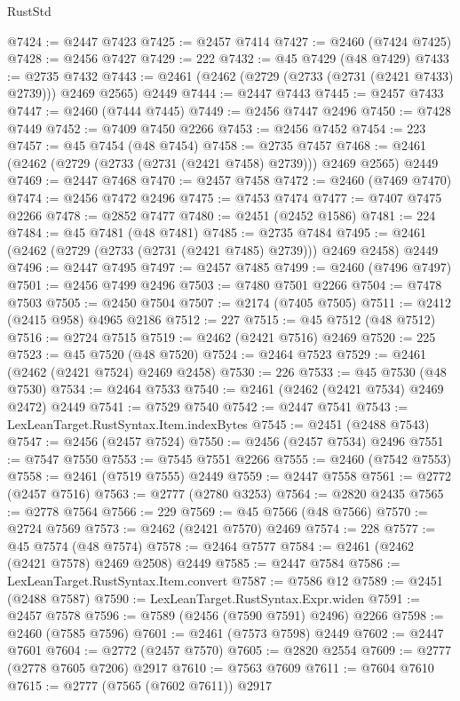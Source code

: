 \begin{lexlean}{RustStd}
\begin{coremodule}
@7424 := @2447 @7423
@7425 := @2457 @7414
@7427 := @2460 (@7424 @7425)
@7428 := @2456 @7427
@7429 := 222
@7432 := @45 @7429 (@48 @7429)
@7433 := @2735 @7432
@7443 := @2461 (@2462 (@2729 (@2733 (@2731 (@2421 @7433) @2739))) @2469 @2565) @2449
@7444 := @2447 @7443
@7445 := @2457 @7433
@7447 := @2460 (@7444 @7445)
@7449 := @2456 @7447 @2496
@7450 := @7428 @7449
@7452 := @7409 @7450 @2266
@7453 := @2456 @7452
@7454 := 223
@7457 := @45 @7454 (@48 @7454)
@7458 := @2735 @7457
@7468 := @2461 (@2462 (@2729 (@2733 (@2731 (@2421 @7458) @2739))) @2469 @2565) @2449
@7469 := @2447 @7468
@7470 := @2457 @7458
@7472 := @2460 (@7469 @7470)
@7474 := @2456 @7472 @2496
@7475 := @7453 @7474
@7477 := @7407 @7475 @2266
@7478 := @2852 @7477
@7480 := @2451 (@2452 @1586)
@7481 := 224
@7484 := @45 @7481 (@48 @7481)
@7485 := @2735 @7484
@7495 := @2461 (@2462 (@2729 (@2733 (@2731 (@2421 @7485) @2739))) @2469 @2458) @2449
@7496 := @2447 @7495
@7497 := @2457 @7485
@7499 := @2460 (@7496 @7497)
@7501 := @2456 @7499 @2496
@7503 := @7480 @7501 @2266
@7504 := @7478 @7503
@7505 := @2450 @7504
@7507 := @2174 (@7405 @7505)
@7511 := @2412 (@2415 @958) @4965 @2186
@7512 := 227
@7515 := @45 @7512 (@48 @7512)
@7516 := @2724 @7515
@7519 := @2462 (@2421 @7516) @2469
@7520 := 225
@7523 := @45 @7520 (@48 @7520)
@7524 := @2464 @7523
@7529 := @2461 (@2462 (@2421 @7524) @2469 @2458)
@7530 := 226
@7533 := @45 @7530 (@48 @7530)
@7534 := @2464 @7533
@7540 := @2461 (@2462 (@2421 @7534) @2469 @2472) @2449
@7541 := @7529 @7540
@7542 := @2447 @7541
@7543 := LexLeanTarget.RustSyntax.Item.indexBytes
@7545 := @2451 (@2488 @7543)
@7547 := @2456 (@2457 @7524)
@7550 := @2456 (@2457 @7534) @2496
@7551 := @7547 @7550
@7553 := @7545 @7551 @2266
@7555 := @2460 (@7542 @7553)
@7558 := @2461 (@7519 @7555) @2449
@7559 := @2447 @7558
@7561 := @2772 (@2457 @7516)
@7563 := @2777 (@2780 @3253)
@7564 := @2820 @2435
@7565 := @2778 @7564
@7566 := 229
@7569 := @45 @7566 (@48 @7566)
@7570 := @2724 @7569
@7573 := @2462 (@2421 @7570) @2469
@7574 := 228
@7577 := @45 @7574 (@48 @7574)
@7578 := @2464 @7577
@7584 := @2461 (@2462 (@2421 @7578) @2469 @2508) @2449
@7585 := @2447 @7584
@7586 := LexLeanTarget.RustSyntax.Item.convert
@7587 := @7586 @12
@7589 := @2451 (@2488 @7587)
@7590 := LexLeanTarget.RustSyntax.Expr.widen
@7591 := @2457 @7578
@7596 := @7589 (@2456 (@7590 @7591) @2496) @2266
@7598 := @2460 (@7585 @7596)
@7601 := @2461 (@7573 @7598) @2449
@7602 := @2447 @7601
@7604 := @2772 (@2457 @7570)
@7605 := @2820 @2554
@7609 := @2777 (@2778 @7605 @7206) @2917
@7610 := @7563 @7609
@7611 := @7604 @7610
@7615 := @2777 (@7565 (@7602 @7611)) @2917

\end{coremodule}
\end{lexlean}
